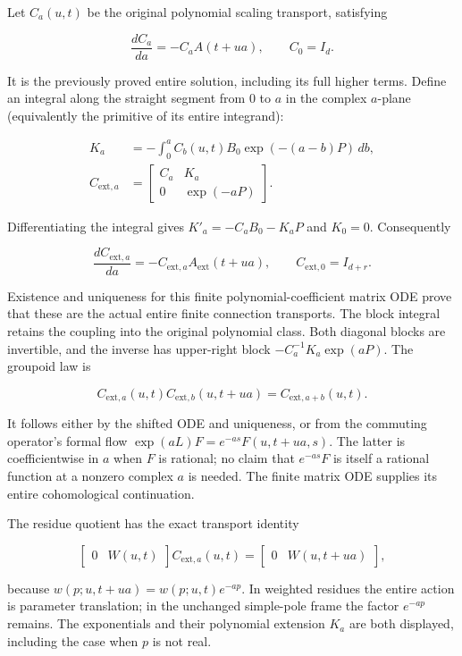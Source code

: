 \documentclass{article}
\begin{document}
Let \(C_a(u,t)\) be the original polynomial scaling transport, satisfying

\[
\frac{dC_a}{da}=-C_a A(t+ua),\qquad C_0=I_d.
\tag{AP14}
\]

It is the previously proved entire solution, including its full higher terms. Define an integral along the straight segment from \(0\) to \(a\) in the complex \(a\)-plane (equivalently the primitive of its entire integrand):

\[
\begin{aligned}
K_a&=-\int_0^a C_b(u,t)B_0\exp(-(a-b)P)\,db,\\
C_{\mathrm{ext},a}&=\begin{bmatrix}C_a&K_a\\0&\exp(-aP)\end{bmatrix}.
\end{aligned}
\tag{AP15}
\]

Differentiating the integral gives \(K'_a=-C_a B_0-K_a P\) and \(K_0=0\). Consequently

\[
\frac{dC_{\mathrm{ext},a}}{da}
=-C_{\mathrm{ext},a}A_{\mathrm{ext}}(t+ua),
\qquad C_{\mathrm{ext},0}=I_{d+r}.
\tag{AP16}
\]

Existence and uniqueness for this finite polynomial-coefficient matrix ODE prove that these are the actual entire finite connection transports. The block integral retains the coupling into the original polynomial class. Both diagonal blocks are invertible, and the inverse has upper-right block \(-C_a^{-1}K_a\exp(aP)\). The groupoid law is

\[
C_{\mathrm{ext},a}(u,t)C_{\mathrm{ext},b}(u,t+ua)
=C_{\mathrm{ext},a+b}(u,t).
\tag{AP17}
\]

It follows either by the shifted ODE and uniqueness, or from the commuting operator's formal flow \(\exp(aL)F=e^{-as}F(u,t+ua,s)\). The latter is coefficientwise in \(a\) when \(F\) is rational; no claim that \(e^{-as}F\) is itself a rational function at a nonzero complex \(a\) is needed. The finite matrix ODE supplies its entire cohomological continuation.

The residue quotient has the exact transport identity

\[
\begin{bmatrix}0&W(u,t)\end{bmatrix}C_{\mathrm{ext},a}(u,t)
=\begin{bmatrix}0&W(u,t+ua)\end{bmatrix},
\tag{AP18}
\]

because \(w(p;u,t+ua)=w(p;u,t)e^{-ap}\). In weighted residues the entire action is parameter translation; in the unchanged simple-pole frame the factor \(e^{-ap}\) remains. The exponentials and their polynomial extension \(K_a\) are both displayed, including the case when \(p\) is not real.
\end{document}
